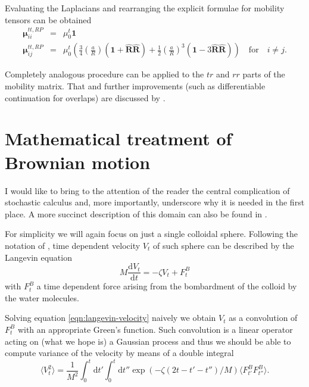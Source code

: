 \documentclass{doctoral}
\newcommand{\dd}{\mathrm{d}}
\begin{document}
Evaluating the Laplacians and rearranging the explicit formulae for mobility tensors can be obtained
\begin{eqnarray}
    \bm{\mu}_{ii}^{tt,RP} &=& \mu_0^t \bm{1} \\
    \bm{\mu}_{ij}^{tt,RP} &=& \mu_0^t \left( \frac{3}{4} \left( \frac{a}{R} \right) \left( \bm{1} + \bm{\hat{R}}\bm{\hat{R}} \right) + \frac{1}{2} \left( \frac{a}{R} \right)^3 \left( \bm{1} -3  \bm{\hat{R}}\bm{\hat{R}} \right) \right) \quad \mathrm{for} \quad i \neq j.
    \label{eqn:rotne-prager-translation}
\end{eqnarray}

Completely analogous procedure can be applied to the $tr$ and $rr$ parts of the mobility matrix. That and further improvements (such as differentiable continuation for overlaps) are discussed by \textcite{Zuk_2018}.

\section{Mathematical treatment of Brownian motion}

I would like to bring to the attention of the reader the central complication of stochastic calculus and, more importantly, underscore why it is needed in the first place. A more succinct description of this domain can also be found in \textcite{Waszkiewicz_2023_pychastic}.

For simplicity we will again focus on just a single colloidal sphere. Following the notation of \textcite{Ottinger_2012}, time dependent velocity $V_t$ of such sphere can be described by the Langevin equation
\begin{equation}
    M \frac{\dd V_t}{\dd t} = - \zeta V_t + F^{B}_t
    \label{eqn:langevin-velocity}
\end{equation}
with $F^B_t$ a time dependent force arising from the bombardment of the colloid by the water molecules.

Solving equation \eqref{eqn:langevin-velocity} naively we obtain $V_t$ as a convolution of $F_t^B$ with an appropriate Green's function. Such convolution is a linear operator acting on (what we hope is) a Gaussian process and thus we should be able to compute variance of the velocity by means of a double integral
\begin{equation}
    \langle V_t^2 \rangle = \frac{1}{M^2} \int_0^t \dd t' \int_0^t \dd t'' \exp\left(-\zeta (2t - t' - t'') / M\right) \langle F_{t'}^B F_{t''}^B \rangle.
    \label{eqn:velocity-variance-integral}
\end{equation}
\end{document}
